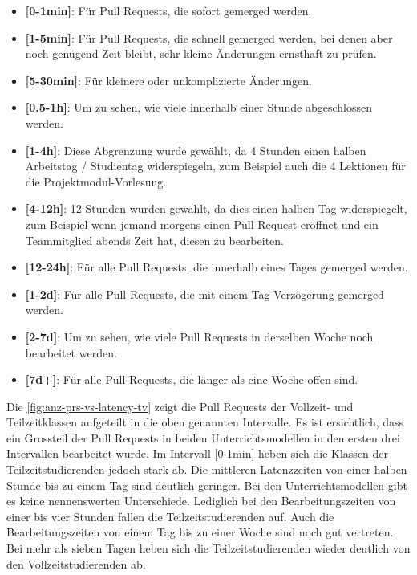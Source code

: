 \begin{itemize}
    \item \textbf{[0-1min]}: Für Pull Requests, die sofort gemerged werden.
    \item \textbf{[1-5min]}: Für Pull Requests, die schnell gemerged werden, bei denen aber noch genügend Zeit bleibt, sehr kleine Änderungen ernsthaft zu prüfen.
    \item \textbf{[5-30min]}: Für kleinere oder unkomplizierte Änderungen.
    \item \textbf{[0.5-1h]}: Um zu sehen, wie viele innerhalb einer Stunde abgeschlossen werden.
    \item \textbf{[1-4h]}: Diese Abgrenzung wurde gewählt, da 4 Stunden einen halben Arbeitstag / Studientag widerspiegeln, zum Beispiel auch die 4 Lektionen für die Projektmodul-Vorlesung.
    \item \textbf{[4-12h]}: 12 Stunden wurden gewählt, da dies einen halben Tag widerspiegelt, zum Beispiel wenn jemand morgens einen Pull Request eröffnet und ein Teammitglied abends Zeit hat, diesen zu bearbeiten.
    \item \textbf{[12-24h]}: Für alle Pull Requests, die innerhalb eines Tages gemerged werden.
    \item \textbf{[1-2d]}: Für alle Pull Requests, die mit einem Tag Verzögerung gemerged werden.
    \item \textbf{[2-7d]}: Um zu sehen, wie viele Pull Requests in derselben Woche noch bearbeitet werden.
    \item \textbf{[7d+]}: Für alle Pull Requests, die länger als eine Woche offen sind.
\end{itemize}


Die \autoref{fig:anz-prs-vs-latency-tv} zeigt die Pull Requests der Vollzeit- und Teilzeitklassen aufgeteilt in die oben genannten Intervalle. Es ist ersichtlich, dass ein Grossteil der Pull Requests in beiden Unterrichtsmodellen in den ersten drei Intervallen bearbeitet wurde. Im Intervall [0-1min] heben sich die Klassen der Teilzeitstudierenden jedoch stark ab. 
Die mittleren Latenzzeiten von einer halben Stunde bis zu einem Tag sind deutlich geringer. Bei den Unterrichtsmodellen gibt es keine nennenswerten Unterschiede. Lediglich bei den Bearbeitungszeiten von einer bis vier Stunden fallen die Teilzeitstudierenden auf. Auch die Bearbeitungszeiten von einem Tag bis zu einer Woche sind noch gut vertreten. Bei mehr als sieben Tagen heben sich die Teilzeitstudierenden wieder deutlich von den Vollzeitstudierenden ab.

